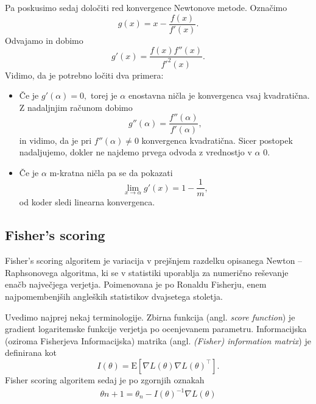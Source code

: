 \documentclass[12pt,a4paper]{amsart}
\theoremstyle{definition} %
\theoremstyle{plain} %
\begin{document}
Pa poskusimo sedaj določiti red konvergence Newtonove metode. Označimo
\[
    g(x) = x - \frac{f(x)}{f'(x)}.
\]
Odvajamo in dobimo
\[
    g'(x) = \frac{f(x)f''(x)}{f'^{2}(x)}.
\]
Vidimo, da je potrebno ločiti dva primera:
\begin{itemize}
    \item Če je $g'(\alpha) = 0,$ torej je $\alpha$ enostavna ničla je konvergenca vsaj kvadratična. Z nadaljnjim računom dobimo
    \[
        g''(\alpha) = \frac{f''(\alpha)}{f'(\alpha)},
    \]
    in vidimo, da je pri $f''(\alpha) \neq 0$ konvergenca kvadratična. Sicer postopek nadaljujemo, dokler ne najdemo prvega odvoda z vrednostjo v $\alpha$ 0.
    \item Če je $\alpha$ m-kratna ničla pa se da pokazati
    \[
        \lim_{x\to\alpha} g'(x) = 1 - \frac{1}{m},
    \]
    od koder sledi linearna konvergenca.
\end{itemize}

\subsection{Fisher's scoring}
Fisher's scoring algoritem je variacija v prejšnjem razdelku opisanega Newton -- Raphsonovega algoritma, ki se v statistiki uporablja za numerično reševanje enačb največjega 
verjetja. Poimenovana je po Ronaldu Fisherju, enem najpomembenjših angleških statistikov dvajsetega stoletja.

Uvedimo najprej nekaj terminologije. Zbirna funkcija (angl. \textit{score function}) je gradient logaritemske funkcije verjetja po ocenjevanem parametru.
Informacijska (oziroma Fisherjeva Informacijska) matrika (angl. \textit{(Fisher) information matrix}) je definirana kot 
\[
    I(\theta) = \mathrm{E}[\nabla L(\theta) \nabla L(\theta)^\top ]. %
\]
Fisher scoring algoritem sedaj je po zgornjih oznakah 
\begin{align}
    \theta{n + 1} = \theta_{n} - I(\theta)^{-1}\nabla L(\theta)
\end{align}
\end{document}
